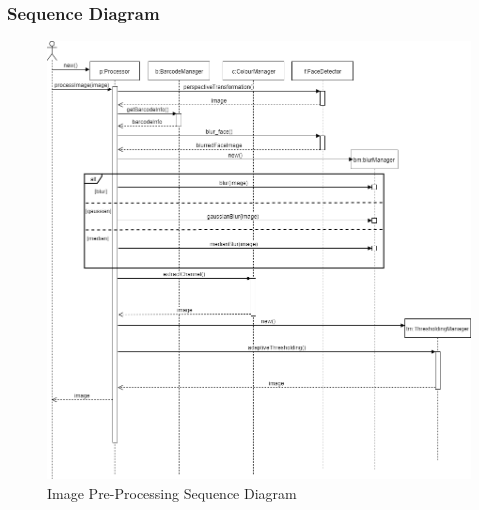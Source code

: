 \documentclass{article}
\begin{document}
\subsubsection{Sequence Diagram}
\begin{figure}[h]
	    \centering
	    \includegraphics[scale=0.5]{img/image_processing_sequence.png}
	    \caption{Image Pre-Processing Sequence Diagram}
	 \end{figure}
\end{document}
